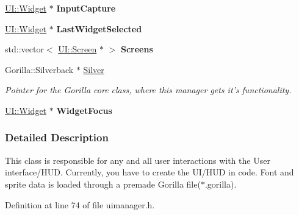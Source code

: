 \begin{DoxyCompactItemize}
\item 
\hypertarget{classMezzanine_1_1UIManager_a79ffa786184180adf026e8992973289c}{
\hyperlink{classMezzanine_1_1UI_1_1Widget}{UI::Widget} $\ast$ {\bfseries InputCapture}}
\label{classMezzanine_1_1UIManager_a79ffa786184180adf026e8992973289c}

\item 
\hypertarget{classMezzanine_1_1UIManager_a375acb1b3c751bc7e76f82d55f9d15d1}{
\hyperlink{classMezzanine_1_1UI_1_1Widget}{UI::Widget} $\ast$ {\bfseries LastWidgetSelected}}
\label{classMezzanine_1_1UIManager_a375acb1b3c751bc7e76f82d55f9d15d1}

\item 
\hypertarget{classMezzanine_1_1UIManager_a2021e925ef8115dd42a6ce1a151ccf22}{
std::vector$<$ \hyperlink{classMezzanine_1_1UI_1_1Screen}{UI::Screen} $\ast$ $>$ {\bfseries Screens}}
\label{classMezzanine_1_1UIManager_a2021e925ef8115dd42a6ce1a151ccf22}

\item 
\hypertarget{classMezzanine_1_1UIManager_af04023901dcec07fea9e6549fdf1c93f}{
Gorilla::Silverback $\ast$ \hyperlink{classMezzanine_1_1UIManager_af04023901dcec07fea9e6549fdf1c93f}{Silver}}
\label{classMezzanine_1_1UIManager_af04023901dcec07fea9e6549fdf1c93f}

\begin{DoxyCompactList}\small\item\em Pointer for the Gorilla core class, where this manager gets it's functionality. \item\end{DoxyCompactList}\item 
\hypertarget{classMezzanine_1_1UIManager_a6ee130f7ac74f239e02c68919671afa4}{
\hyperlink{classMezzanine_1_1UI_1_1Widget}{UI::Widget} $\ast$ {\bfseries WidgetFocus}}
\label{classMezzanine_1_1UIManager_a6ee130f7ac74f239e02c68919671afa4}

\end{DoxyCompactItemize}


\subsubsection{Detailed Description}
This class is responsible for any and all user interactions with the User interface/HUD. Currently, you have to create the UI/HUD in code. Font and sprite data is loaded through a premade Gorilla file($\ast$.gorilla). 

Definition at line 74 of file uimanager.h.



